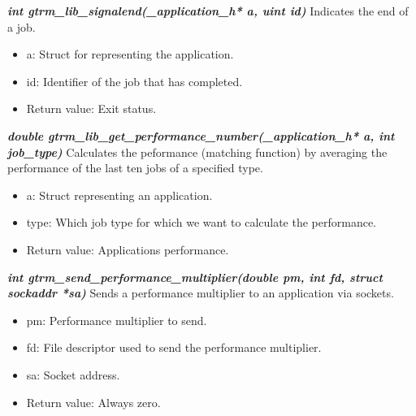 \documentclass[nobiblatex]{LTHthesis}
\begin{document}
\begin{framed}
	\begin{flushleft}	
			\emph{\textbf{{int gtrm\_lib\_signalend(\_application\_h* a, uint id)}}}
			Indicates the end of a job.
			\begin{itemize}
			\item a: Struct for representing the application.
			\item id: Identifier of the job that has completed.
			\item Return value: Exit status.
			\end{itemize}
	\end{flushleft}
\end{framed}


\begin{framed}
	\begin{flushleft}	
			\emph{\textbf{{double gtrm\_lib\_get\_performance\_number(\_application\_h* a, int job\_type)}}}
			Calculates the peformance (matching function) by averaging the performance of the last ten jobs of a specified type.
			\begin{itemize}
			\item a: Struct representing an application.
			\item type: Which job type for which we want to calculate the performance.
			\item Return value: Applications performance.
			\end{itemize}
	\end{flushleft}
\end{framed}

\begin{framed}
	\begin{flushleft}	
			\emph{\textbf{{int gtrm\_send\_performance\_multiplier(double pm, int fd, struct sockaddr *sa)}}}
			Sends a performance multiplier to an application via sockets.
			\begin{itemize} 
			\item pm: Performance multiplier to send.
			\item fd: File descriptor used to send the performance multiplier.
			\item sa: Socket address.
			\item Return value: Always zero.
			\end{itemize}
	\end{flushleft}
\end{framed}
\end{document}
